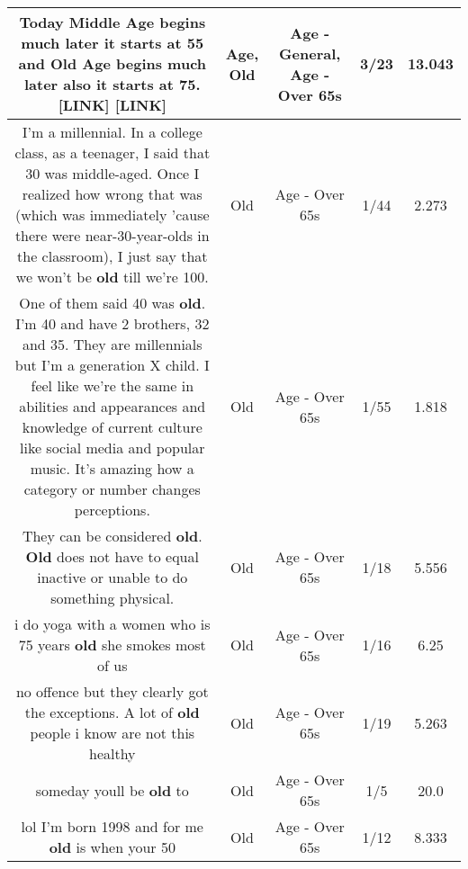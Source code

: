 \documentclass[11pt]{article}
\newlength\mylength
\begin{document}
\begin{center}
\begin{longtable}{|C{.65\mylength}|C{.30\mylength}|C{.12\mylength}|C{.12\mylength}|C{.12\mylength}|}
  \small Today Middle \textbf{Age} begins much later it starts at 55 and \textbf{Old} \textbf{Age} begins much later also it starts at 75. [LINK]  [LINK] \normalsize   & Age, Old & Age - General, Age - Over 65s & 3/23 & 13.043 \\  \hline
  \small I'm a millennial. In a college class, as a teenager, I said that 30 was middle-aged. Once I realized how wrong that was (which was immediately 'cause there were near-30-year-olds in the classroom), I just say that we won't be \textbf{old} till we're 100.\normalsize   & Old & Age - Over 65s & 1/44 & 2.273 \\  \hline
  \small One of them said 40 was \textbf{old}. I'm 40 and have 2 brothers, 32 and 35. They are millennials but I'm a generation X child. I feel like we're the same in abilities and appearances and knowledge of current culture like social media and popular music. It's amazing how a category or number changes perceptions.\normalsize   & Old & Age - Over 65s & 1/55 & 1.818 \\  \hline
  \small They can be considered \textbf{old}. \textbf{Old} does not have to equal inactive or unable to do something physical.\normalsize   & Old & Age - Over 65s & 1/18 & 5.556 \\  \hline
  \small i do yoga with a women who is 75 years \textbf{old} she smokes most of us\normalsize   & Old & Age - Over 65s & 1/16 & 6.25 \\  \hline
  \small no offence but they clearly got the exceptions. A lot of \textbf{old} people i know are not this healthy\normalsize   & Old & Age - Over 65s & 1/19 & 5.263 \\  \hline
  \small someday youll be \textbf{old} to\normalsize   & Old & Age - Over 65s & 1/5 & 20.0 \\  \hline
  \small lol I'm born 1998 and for me \textbf{old} is when your 50\normalsize   & Old & Age - Over 65s & 1/12 & 8.333 \\  \hline

\end{longtable}
\end{center}
\end{document}
